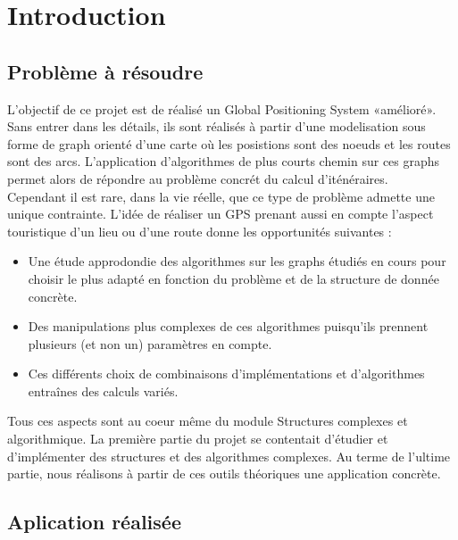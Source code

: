 \chapter{Introduction}

\renewcommand{\labelitemi}{$\bullet$}
\section{Problème à résoudre}
L'objectif de ce projet est de réalisé un Global Positioning System «amélioré». Sans entrer dans les détails, ils sont réalisés à partir d'une modelisation sous forme de graph orienté d'une carte où les posistions sont des noeuds et les routes sont des arcs. L'application d'algorithmes de plus courts chemin sur ces graphs permet alors de répondre au problème concrét du calcul d'iténéraires.
\\
Cependant il est rare, dans la vie réelle, que ce type de problème admette une unique contrainte. L'idée de réaliser un GPS prenant aussi en compte l'aspect touristique d'un lieu ou d'une route donne les opportunités suivantes : 

\begin{itemize}
\item
Une étude approdondie des algorithmes sur les graphs étudiés en cours pour choisir le plus adapté en fonction du problème et de la structure de donnée concrète.
\item
Des manipulations plus complexes de ces algorithmes puisqu'ils prennent plusieurs (et non un) paramètres en compte.
\item
Ces différents choix de combinaisons d'implémentations et d'algorithmes entraînes des calculs variés.
\end{itemize}

Tous ces aspects sont au coeur même du module Structures complexes et algorithmique. La première partie du projet se contentait d'étudier et d'implémenter des structures et des algorithmes complexes. Au terme de l'ultime partie, nous réalisons à partir de ces outils  théoriques une application concrète.


\section{Aplication réalisée}

